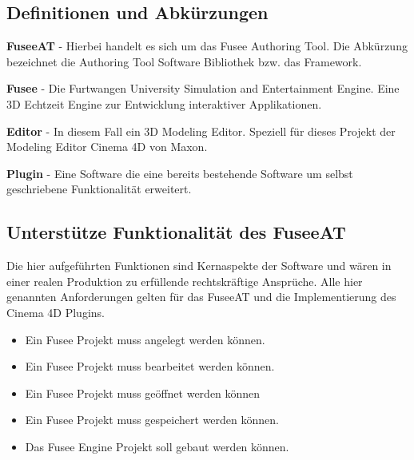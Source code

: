 \documentclass[pagesize, paper=a4, fontsize=12pt, titlepage=true, headings=small, headnosepline, abstractoff, liststotoc, nochapterprefix, plainheadsepline, twoside]{scrreprt}
\begin{document}
\subsection{Definitionen und Abkürzungen}
\textbf{FuseeAT} - Hierbei handelt es sich um das Fusee Authoring Tool. Die Abkürzung bezeichnet die Authoring Tool Software Bibliothek bzw. das Framework.

\textbf{Fusee} - Die Furtwangen University Simulation and Entertainment Engine. Eine 3D Echtzeit Engine zur Entwicklung interaktiver Applikationen.

\textbf{Editor} - In diesem Fall ein 3D Modeling Editor. Speziell für dieses Projekt der Modeling Editor Cinema 4D von Maxon.

\textbf{Plugin} - Eine Software die eine bereits bestehende Software um selbst geschriebene Funktionalität erweitert.

\subsection{Unterstütze Funktionalität des FuseeAT}
Die hier aufgeführten Funktionen sind Kernaspekte der Software und wären in einer realen Produktion zu erfüllende rechtskräftige Ansprüche. Alle hier genannten Anforderungen gelten für das FuseeAT und die Implementierung des Cinema 4D Plugins.
\begin{itemize}
\item Ein Fusee Projekt muss angelegt werden können.
\item Ein Fusee Projekt muss bearbeitet werden können.
\item Ein Fusee Projekt muss geöffnet werden können
\item Ein Fusee Projekt muss gespeichert werden können.
\item Das Fusee Engine Projekt soll gebaut werden können.
\end{itemize}
\end{document}
